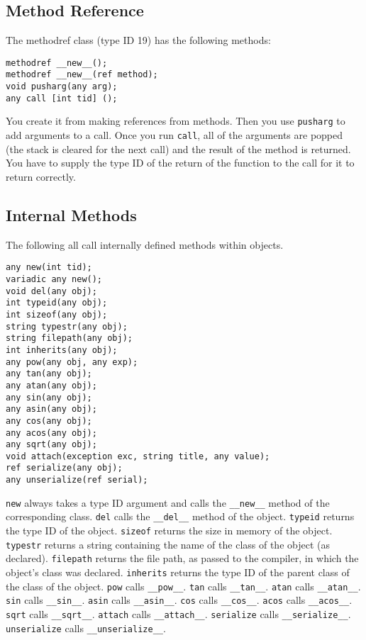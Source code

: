 \documentclass[10pt,a4paper]{article}
\begin{document}
\subsection{Method Reference}
The methodref class (type ID 19) has the following methods:
\begin{verbatim}
methodref __new__();
methodref __new__(ref method);
void pusharg(any arg);
any call [int tid] ();
\end{verbatim}

You create it from making references from methods. Then you use \verb|pusharg| to add arguments to a call. Once you run \verb|call|, all of the arguments are popped (the stack is cleared for the next call) and the result of the method is returned. You have to supply the type ID of the return of the function to the call for it to return correctly.

\subsection{Internal Methods}
\label{sec:internalMethods}
The following all call internally defined methods within objects.
\begin{verbatim}
any new(int tid);
variadic any new();
void del(any obj);
int typeid(any obj);
int sizeof(any obj);
string typestr(any obj);
string filepath(any obj);
int inherits(any obj);
any pow(any obj, any exp);
any tan(any obj);
any atan(any obj);
any sin(any obj);
any asin(any obj);
any cos(any obj);
any acos(any obj);
any sqrt(any obj);
void attach(exception exc, string title, any value);
ref serialize(any obj);
any unserialize(ref serial);
\end{verbatim}

\verb|new| always takes a type ID argument and calls the \verb|__new__| method of the corresponding class. \verb|del| calls the \verb|__del__| method of the object. \verb|typeid| returns the type ID of the object. \verb|sizeof| returns the size in memory of the object. \verb|typestr| returns a string containing the name of the class of the object (as declared). \verb|filepath| returns the file path, as passed to the compiler, in which the object's class was declared. \verb|inherits| returns the type ID of the parent class of the class of the object. \verb|pow| calls \verb|__pow__|. \verb|tan| calls \verb|__tan__|. \verb|atan| calls \verb|__atan__|. \verb|sin| calls \verb|__sin__|. \verb|asin| calls \verb|__asin__|. \verb|cos| calls \verb|__cos__|. \verb|acos| calls \verb|__acos__|. \verb|sqrt| calls \verb|__sqrt__|. \verb|attach| calls \verb|__attach__|. \verb|serialize| calls \verb|__serialize__|. \verb|unserialize| calls \verb|__unserialize__|.
\end{document}

